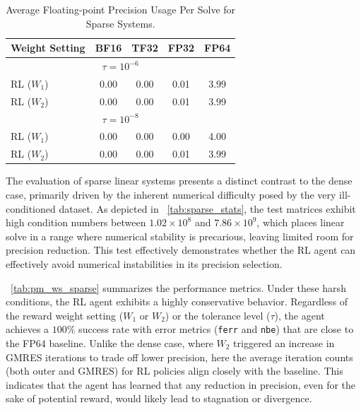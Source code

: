 \documentclass[Afour,sageh,times]{sagej}
\theoremstyle{plain}
\theoremstyle{definition}
\begin{document}
\begin{table}[h!]
\centering
\caption{Average Floating-point Precision Usage Per Solve for Sparse Systems.}
\label{tab:prec_usage_sparse}
\scriptsize
\setlength{\tabcolsep}{7pt}
\renewcommand{\arraystretch}{1.15}

\begin{tabular}{l
                S[table-format=1.2]
                S[table-format=1.2]
                S[table-format=1.2]
                S[table-format=1.2]}
\toprule
\textbf{Weight Setting} & \textbf{BF16} & \textbf{TF32} & \textbf{FP32} & \textbf{FP64} \\
\midrule

\\
\midrule
{RL ($W_1$)} & 0.00 & 0.00 & 0.01 & 3.99 \\
{RL ($W_2$)} & 0.00 & 0.00 & 0.01 & 3.99 \\
\midrule

\\
\midrule
{RL ($W_1$)} & 0.00 & 0.00 & 0.00 & 4.00 \\
{RL ($W_2$)} & 0.00 & 0.00 & 0.01 & 3.99 \\
\bottomrule
\end{tabular}
\end{table}

The evaluation of sparse linear systems presents a distinct contrast to the dense case, primarily driven by the inherent numerical difficulty posed by the very ill-conditioned dataset. As depicted in \tablename~\ref{tab:sparse_stats}, the test matrices exhibit high condition numbers between $1.02{\times}10^{8}$ and $7.86{\times}10^{9}$, which places linear solve in a range where numerical stability is precarious, leaving limited room for precision reduction. This test effectively demonstrates whether the RL agent can effectively avoid numerical instabilities in its precision selection.

\tablename~\ref{tab:pm_ws_sparse} summarizes the performance metrics. Under these harsh conditions, the RL agent exhibits a highly conservative behavior. Regardless of the reward weight setting ($W_1$ or $W_2$) or the tolerance level ($\tau$), the agent achieves a $100\%$ success rate with error metrics (\texttt{ferr} and \texttt{nbe}) that are close to the FP64 baseline.
Unlike the dense case, where $W_2$ triggered an increase in GMRES iterations to trade off lower precision, here the average iteration counts (both outer and GMRES) for RL policies align closely with the baseline. This indicates that the agent has learned that any reduction in precision, even for the sake of potential reward, would likely lead to stagnation or divergence.
\end{document}
